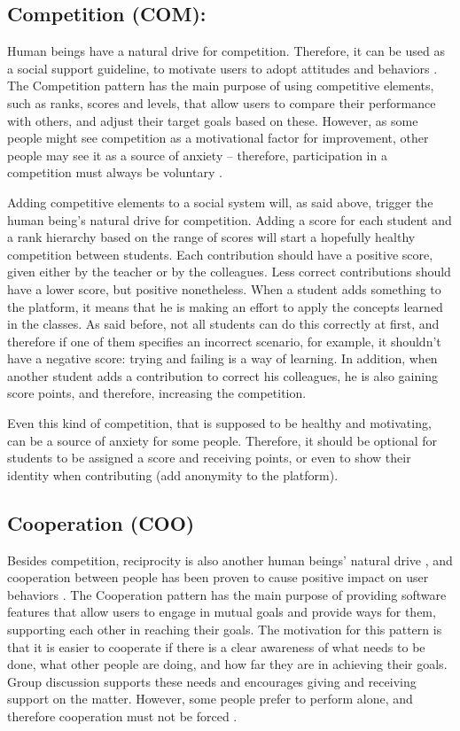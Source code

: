 \subsection{Competition (COM):}
Human beings have a natural drive for competition. Therefore, it can be used as a social support guideline, to motivate users to adopt attitudes and behaviors \cite{oinas2009persuasive}. The Competition pattern has the main purpose of using competitive elements, such as ranks, scores and levels, that allow users to compare their performance with others, and adjust their target goals based on these. However, as some people might see competition as a motivational factor for improvement, other people may see it as a source of anxiety – therefore, participation in a competition must always be voluntary \cite{oduor2014persuasive}.

Adding competitive elements to a social system will, as said above, trigger the human being's natural drive for competition. Adding a score for each student and a rank hierarchy based on the range of scores will start a hopefully healthy competition between students. Each contribution should have a positive score, given either by the teacher or by the colleagues. Less correct contributions should have a lower score, but positive nonetheless. When a student adds something to the platform, it means that he is making an effort to apply the concepts learned in the classes. As said before, not all students can do this correctly at first, and therefore if one of them specifies an incorrect scenario, for example, it shouldn't have a negative score: trying and failing is a way of learning. In addition, when another student adds a contribution to correct his colleagues, he is also gaining score points, and therefore, increasing the competition.

Even this kind of competition, that is supposed to be healthy and motivating, can be a source of anxiety for some people. Therefore, it should be optional for students to be assigned a score and receiving points, or even to show their identity when contributing (add anonymity to the platform). 

\subsection{Cooperation (COO)}
Besides competition, reciprocity is also another human beings' natural drive \cite{cialdini1993influence,malone1987making}, and cooperation between people has been proven to cause positive impact on user behaviors \cite{stibe2012exploring}. The Cooperation pattern has the main purpose of providing software features that allow users to engage in mutual goals and provide ways for them, supporting each other in reaching their goals. The motivation for this pattern is that it is easier to cooperate if there is a clear awareness of what needs to be done, what other people are doing, and how far they are in achieving their goals. Group discussion supports these needs and encourages giving and receiving support on the matter. However, some people prefer to perform alone, and therefore cooperation must not be forced \cite{oduor2014persuasive}. 

